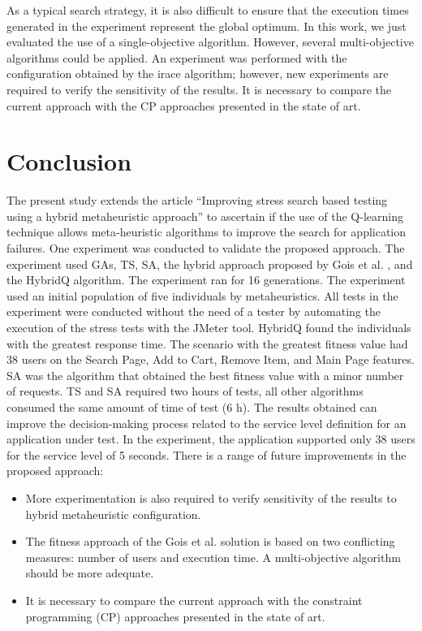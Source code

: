 \documentclass{bmcart}
\begin{document}
As a typical search strategy, it is also difficult to ensure that the execution times generated in the experiment represent the global optimum. In this work, we just evaluated the use of a single-objective algorithm. However, several multi-objective algorithms could be applied.  An experiment was performed with the configuration obtained by the irace algorithm; however, new experiments are required to verify the sensitivity of the results. It is necessary to compare the current approach with the CP approaches presented in the state of art.



\section{Conclusion}

The present study extends the article ``Improving stress search based testing using a hybrid metaheuristic approach'' to ascertain if the use of the Q-learning technique allows meta-heuristic algorithms to improve the search for application failures. One experiment was conducted to validate the proposed approach. The experiment used GAs, TS, SA, the hybrid approach proposed by Gois et al. \citep{Gois2016}, and the HybridQ algorithm. The experiment ran for 16 generations. The experiment used an initial population of five individuals by metaheuristics. All tests in the experiment were conducted without the need of a tester by automating the execution of the stress tests with the JMeter tool.  HybridQ found the individuals with the greatest response time. The scenario with the greatest fitness value had 38 users on the Search Page, Add to Cart, Remove Item, and Main Page features. SA was the algorithm that obtained the best fitness value with a minor number of requests. TS and SA required two hours of tests, all other algorithms consumed the same amount of time of test (6 h). The results obtained can improve the decision-making process related to the service level definition for an application under test. In the experiment, the application supported only 38 users for the service level of 5 seconds. There is a range of future improvements in the proposed approach:

\begin{itemize}
\item More experimentation is also required to verify sensitivity of the results to  hybrid metaheuristic configuration. 
\item The fitness approach of the Gois et al. solution is based on two conflicting measures: number of users and execution time. A multi-objective algorithm should be more adequate. 
\item It is necessary to compare the current approach with the constraint programming (CP) approaches presented in the state of art.

\end{itemize}
\end{document}
